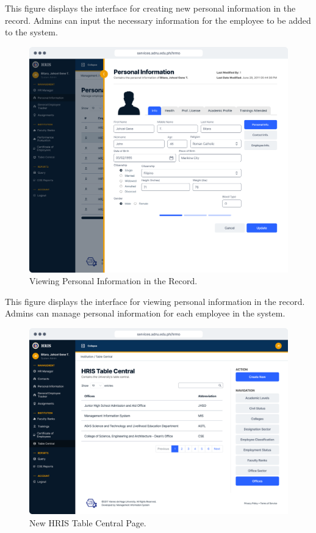     This figure displays the interface for creating new personal information in the record. Admins can input the necessary information for the employee to be added to the system.

    \begin{figure}[H]
        \centering
        \includegraphics[width=1\linewidth]{figures/app/pi-view.png}
        \caption{Viewing Personal Information in the Record.}
        \label{fig:app-pi-view}
    \end{figure}

    This figure displays the interface for viewing personal information in the record. Admins can manage personal information for each employee in the system.

    \begin{figure}[H]
        \centering
        \includegraphics[width=1\linewidth]{figures/app/table-central.png}
        \caption{New HRIS Table Central Page.}
        \label{fig:app-table-central}
    \end{figure}

